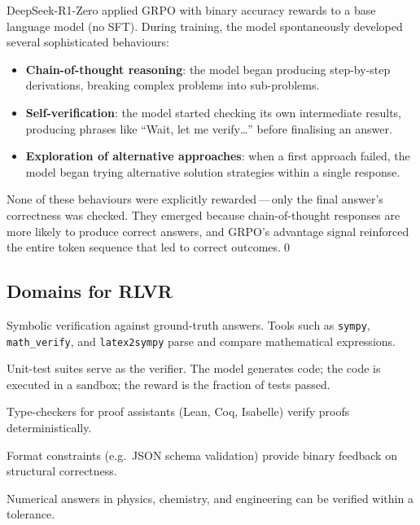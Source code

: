 \begin{example}
\label{ex:r1-zero}
DeepSeek-R1-Zero applied GRPO with binary accuracy rewards to a base language model (no SFT).  During training, the model spontaneously developed several sophisticated behaviours:
\begin{itemize}[leftmargin=*]
  \item \textbf{Chain-of-thought reasoning}: the model began producing step-by-step derivations, breaking complex problems into sub-problems.
  \item \textbf{Self-verification}: the model started checking its own intermediate results, producing phrases like ``Wait, let me verify\ldots'' before finalising an answer.
  \item \textbf{Exploration of alternative approaches}: when a first approach failed, the model began trying alternative solution strategies within a single response.
\end{itemize}
None of these behaviours were explicitly rewarded\,---\,only the final answer's correctness was checked.  They emerged because chain-of-thought responses are more likely to produce correct answers, and GRPO's advantage signal reinforced the entire token sequence that led to correct outcomes.\qed
\end{example}

\subsection{Domains for RLVR}

\begin{description}[leftmargin=!,labelwidth=3.5cm]
  \item[Mathematics] Symbolic verification against ground-truth answers.  Tools such as \texttt{sympy}, \texttt{math\_verify}, and \texttt{latex2sympy} parse and compare mathematical expressions.
  \item[Code generation] Unit-test suites serve as the verifier.  The model generates code; the code is executed in a sandbox; the reward is the fraction of tests passed.
  \item[Formal proofs] Type-checkers for proof assistants (Lean, Coq, Isabelle) verify proofs deterministically.
  \item[Constrained generation] Format constraints (e.g.\ JSON schema validation) provide binary feedback on structural correctness.
  \item[Science] Numerical answers in physics, chemistry, and engineering can be verified within a tolerance.
\end{description}

